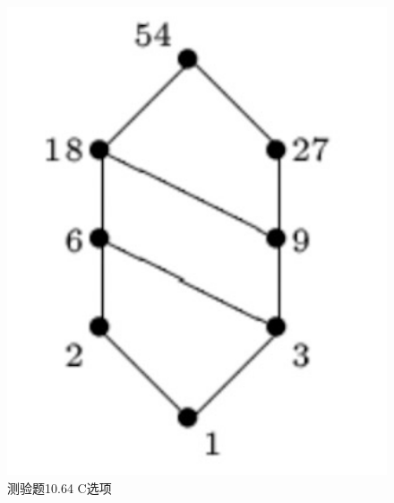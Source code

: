\documentclass[UTF8, heading=true]{ctexart}
\begin{document}
\begin{figure}[H]
  \centering
  \begin{minipage}[t]{0.2\textwidth}
      \centering
      \includegraphics[width=1\textwidth]{10.64_3.jpg} %
      \vspace{-0.3cm}
      \caption{测验题10.64 C选项}
  \end{minipage}
  \hspace{0.22\textwidth} %
  \begin{minipage}[t]{0.2\textwidth}
      \centering

\end{minipage}
\end{figure}
\end{document}
